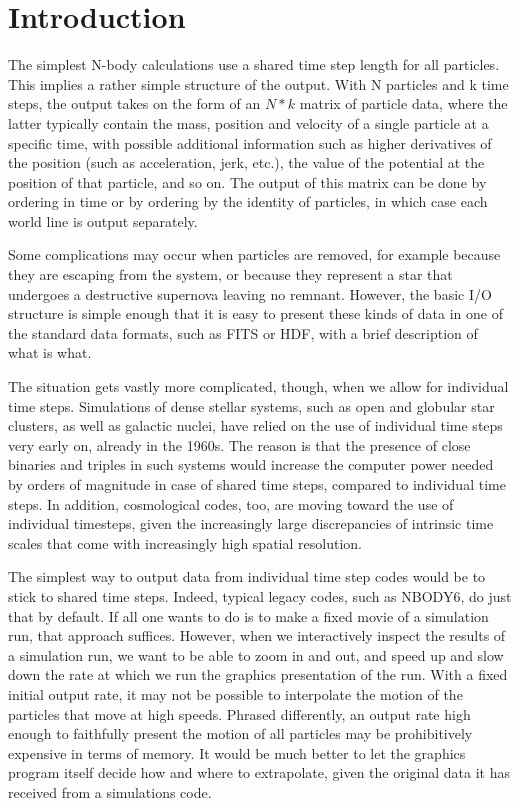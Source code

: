\documentclass{elsart5p}
\begin{document}
\section{Introduction}

The simplest N-body calculations use a shared time step length for all
particles.  This implies a rather simple structure of the output.  With
N particles and k time steps, the output takes on the form of an $N*k$
matrix of particle data, where the latter typically contain the mass,
position and velocity of a single particle at a specific time, with
possible additional information such as higher derivatives of the position
(such as acceleration, jerk, etc.), the value of the potential at the 
position of that particle, and so on.  The output of this matrix can
be done by ordering in time or by ordering by the identity of particles,
in which case each world line is output separately.

Some complications may occur when particles are removed, for example
because they are escaping from the system, or because they represent
a star that undergoes a destructive supernova leaving no remnant.
However, the basic I/O structure is simple enough that it is easy to
present these kinds of data in one of the standard data formats, such
as FITS or HDF, with a brief description of what is what.

The situation gets vastly more complicated, though, when we allow for
individual time steps.  Simulations of dense stellar systems, such as
open and globular star clusters, as well as galactic nuclei, have
relied on the use of individual time steps very early on, already in
the 1960s.  The reason is that the presence of close binaries and
triples in such systems would increase the computer power needed by
orders of magnitude in case of shared time steps, compared to
individual time steps.  In addition, cosmological codes, too, are
moving toward the use of individual timesteps, given the increasingly
large discrepancies of intrinsic time scales that come with
increasingly high spatial resolution.

The simplest way to output data from individual time step codes would
be to stick to shared time steps.  Indeed, typical legacy codes, such
as NBODY6, do just that by default.  If all one wants to do is to make
a fixed movie of a simulation run, that approach suffices.  However,
when we interactively inspect the results of a simulation run, we want
to be able to zoom in and out, and speed up and slow down the rate at
which we run the graphics presentation of the run.  With a fixed
initial output rate, it may not be possible to interpolate the motion
of the particles that move at high speeds.  Phrased differently, an
output rate high enough to faithfully present the motion of all
particles may be prohibitively expensive in terms of memory.  It would
be much better to let the graphics program itself decide how and where
to extrapolate, given the original data it has received from a
simulations code.
\end{document}
